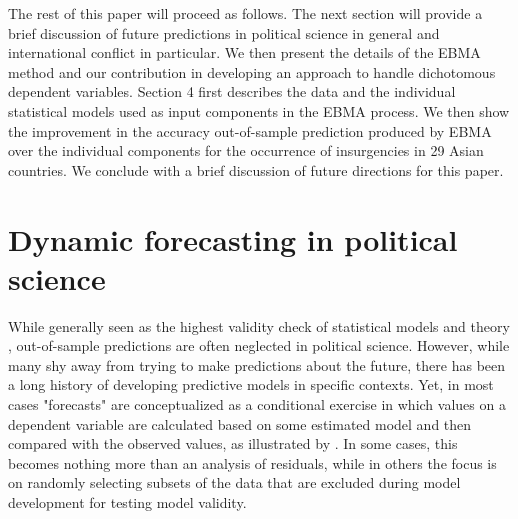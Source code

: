 \documentclass[pdftex,12pt,fullpage,oneside]{amsart}
\begin{document}
The rest of this paper will proceed as follows. The next section will
provide a brief discussion of future predictions in political science
in general and international conflict in particular. We then present
the details of the EBMA method and our contribution in developing an
approach to handle dichotomous dependent variables. Section 4 first
describes the data and the individual statistical models used as input
components in the EBMA process. We then show the improvement in the
accuracy out-of-sample prediction produced by EBMA over the individual
components for the occurrence of insurgencies in 29 Asian
countries. We conclude with a brief discussion of future directions
for this paper.

\section{Dynamic forecasting in political science}

While generally seen as the highest validity check of statistical
models and theory \citep{Demarchi:etal:2004,Beck:etal:2004},
out-of-sample predictions are often neglected in political
science. However, while many shy away from trying to make predictions
about the future, there has been a long history of developing
predictive models in specific contexts. Yet, in most cases
"forecasts" are conceptualized as a conditional exercise in which
values on a dependent variable are calculated based on some estimated
model and then compared with the observed values, as illustrated by
\citet{Hildebrand:etal:1976}. In some cases, this becomes nothing more
than an analysis of residuals, while in others the focus is on
randomly selecting subsets of the data that are excluded during model
development for testing model validity.
\end{document}
